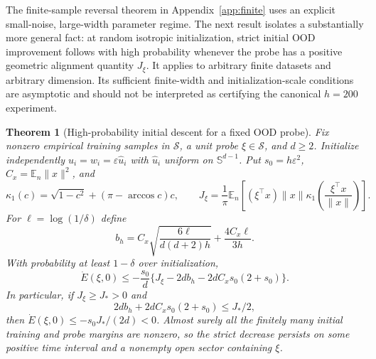 \documentclass[10pt]{article}
\newtheorem{theorem}{Theorem}[section]
\theoremstyle{remark}\newtheorem{remark}[theorem]{Remark}
\begin{document}
The finite-sample reversal theorem in Appendix~\ref{app:finite} uses an
explicit small-noise, large-width parameter regime. The next result isolates
a substantially more general fact: at random isotropic initialization,
strict initial OOD improvement follows with high probability whenever the
probe has a positive geometric alignment quantity \(J_\xi\). It applies to
arbitrary finite datasets and arbitrary dimension. Its sufficient finite-width
and initialization-scale conditions are asymptotic and should not be
interpreted as certifying the canonical \(h=200\) experiment.


\begin{theorem}[High-probability initial descent for a fixed OOD probe]
\label{sbaudit:initial-descent}
Fix nonzero empirical training samples in $\mathcal S$, a unit probe
$\xi\in\mathcal S$, and $d\ge2$. Initialize independently
$u_i=w_i=\varepsilon\widehat u_i$ with $\widehat u_i$ uniform on
$\mathbb S^{d-1}$. Put $s_0=h\varepsilon^2$,
$C_x=\mathbb E_n\|x\|^2$, and
\[
 \kappa_1(c)=\sqrt{1-c^2}+(\pi-\arccos c)c,\qquad
 J_\xi=\frac1\pi\mathbb E_n\left[
 (\xi^\top x)\|x\| \kappa_1\left(\frac{\xi^\top x}{\|x\|}\right)\right].
\]
For $\ell=\log(1/\delta)$ define
\[
 b_h=C_x\sqrt{\frac{6\ell}{d(d+2)h}}+
                 \frac{4C_x\ell}{3h}.
\]
With probability at least $1-\delta$ over initialization,
\begin{equation}\label{sbaudit:initial-rate}
 \dot E(\xi,0)\le-\frac{s_0}{d}
 \{J_\xi-2db_h-2dC_xs_0(2+s_0)\}.
\end{equation}
In particular, if $J_\xi\ge J_*>0$ and
\begin{equation}\label{sbaudit:initial-budget}
 2db_h+2dC_xs_0(2+s_0)\le J_*/2,
\end{equation}
then $\dot E(\xi,0)\le-s_0J_*/(2d)<0$. Almost surely all the finitely
many initial training and probe margins are nonzero, so the strict
decrease persists on some positive time interval and a nonempty open
sector containing $\xi$.
\end{theorem}
\end{document}
